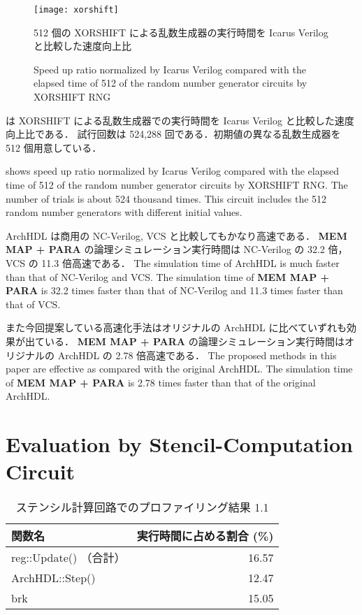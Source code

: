 \begin{figure}[tb]
 \centering
 \texttt{[image: xorshift]}
 \caption{512 個の XORSHIFT による乱数生成器の実行時間を Icarus Verilog と比較した速度向上比}
\fi
 \caption{Speed up ratio normalized by Icarus Verilog compared with the elapsed time of 512 of the random number generator circuits by XORSHIFT RNG}
 \label{fig:xorshift}
\end{figure}

 は XORSHIFT による乱数生成器での実行時間を Icarus Verilog と比較した速度向上比である．
試行回数は 524,288 回である．初期値の異なる乱数生成器を 512 個用意している．
\fi

 shows speed up ratio normalized by Icarus Verilog compared with the elapsed time of 512 of the random number generator circuits by XORSHIFT RNG.
The number of trials is about 524 thousand times.
This circuit includes the 512 random number generators with different initial values.

ArchHDL は商用の NC-Verilog, VCS と比較してもかなり高速である．
\textbf{MEM MAP + PARA} の論理シミュレーション実行時間は NC-Verilog の 32.2 倍，VCS の 11.3 倍高速である．
\fi
The simulation time of ArchHDL is much faster than that of NC-Verilog and VCS.
The simulation time of \textbf{MEM MAP + PARA} is 32.2 times faster than that of NC-Verilog and 11.3 times faster than that of VCS.

また今回提案している高速化手法はオリジナルの ArchHDL に比べていずれも効果が出ている．
\textbf{MEM MAP + PARA} の論理シミュレーション実行時間はオリジナルの ArchHDL の 2.78 倍高速である．
\fi
The proposed methods in this paper are effective as compared with the original ArchHDL.
The simulation time of \textbf{MEM MAP + PARA} is 2.78 times faster than that of the original ArchHDL.


\section{Evaluation by Stencil-Computation Circuit}


\begin{table}[tb]
 \caption{ステンシル計算回路でのプロファイリング結果 1.1}
 \label{table:stencil_prof1.1}
 \begin{center}
  \begin{tabular}{lr} \toprule
  関数名 & 実行時間に占める割合 (\%) \\ \midrule
  reg::Update() （合計） & 16.57 \\
  ArchHDL::Step() & 12.47 \\
  brk & 15.05 \\ \bottomrule
  \end{tabular}
 \end{center}
\end{table}

